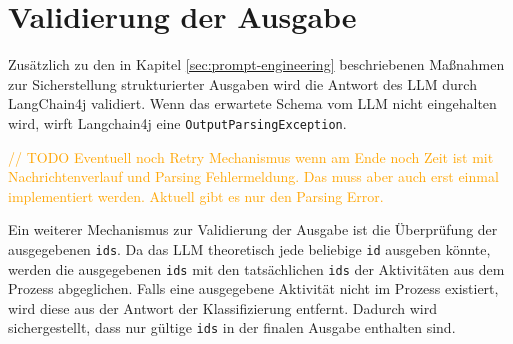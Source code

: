 \section{Validierung der Ausgabe}\label{sec:validierung-der-ausgabe}

Zusätzlich zu den in Kapitel \ref{sec:prompt-engineering} beschriebenen Maßnahmen zur Sicherstellung strukturierter Ausgaben wird die Antwort des \ac{LLM} durch LangChain4j validiert. Wenn das erwartete Schema vom \ac{LLM} nicht eingehalten wird, wirft Langchain4j eine \texttt{OutputParsingException}.

\textcolor{orange}{// TODO Eventuell noch Retry Mechanismus wenn am Ende noch Zeit ist mit Nachrichtenverlauf und Parsing Fehlermeldung. Das muss aber auch erst einmal implementiert werden. Aktuell gibt es nur den Parsing Error.}

Ein weiterer Mechanismus zur Validierung der Ausgabe ist die Überprüfung der ausgegebenen \texttt{ids}. Da das \ac{LLM} theoretisch jede beliebige \texttt{id} ausgeben könnte, werden die ausgegebenen \texttt{ids} mit den tatsächlichen \texttt{ids} der Aktivitäten aus dem Prozess abgeglichen. Falls eine ausgegebene Aktivität nicht im Prozess existiert, wird diese aus der Antwort der Klassifizierung entfernt. Dadurch wird sichergestellt, dass nur gültige \texttt{ids} in der finalen Ausgabe enthalten sind.
